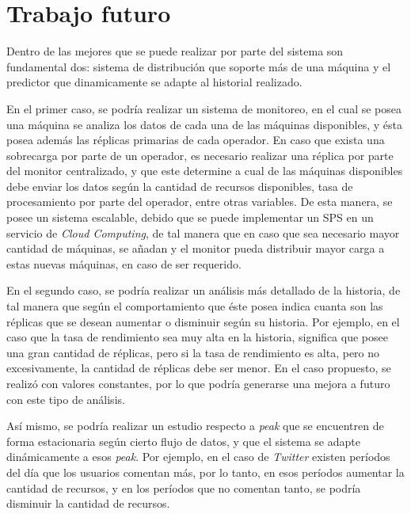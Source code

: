 \section{Trabajo futuro}

Dentro de las mejores que se puede realizar por parte del sistema son fundamental dos: sistema de distribución que soporte más de una máquina y el predictor que dinamicamente se adapte al historial realizado.

En el primer caso, se podría realizar un sistema de monitoreo, en el cual se posea una máquina se analiza los datos de cada una de las máquinas disponibles, y ésta posea además las réplicas primarias de cada operador. En caso que exista una sobrecarga por parte de un operador, es necesario realizar una réplica por parte del monitor centralizado, y que este determine a cual de las máquinas disponibles debe enviar los datos según la cantidad de recursos disponibles, tasa de procesamiento por parte del operador, entre otras variables. De esta manera, se posee un sistema escalable, debido que se puede implementar un SPS en un servicio de \textit{Cloud Computing}, de tal manera que en caso que sea necesario mayor cantidad de máquinas, se añadan y el monitor pueda distribuir mayor carga a estas nuevas máquinas, en caso de ser requerido.

En el segundo caso, se podría realizar un análisis más detallado de la historia, de tal manera que según el comportamiento que éste posea indica cuanta son las réplicas que se desean aumentar o disminuir según su historia. Por ejemplo, en el caso que la tasa de rendimiento sea muy alta en la historia, significa que posee una gran cantidad de réplicas, pero si la tasa de rendimiento es alta, pero no excesivamente, la cantidad de réplicas debe ser menor. En el caso propuesto, se realizó con valores constantes, por lo que podría generarse una mejora a futuro con este tipo de análisis.

Así mismo, se podría realizar un estudio respecto a \textit{peak} que se encuentren de forma estacionaria según cierto flujo de datos, y que el sistema se adapte dinámicamente a esos \textit{peak}. Por ejemplo, en el caso de \textit{Twitter} existen períodos del día que los usuarios comentan más, por lo tanto, en esos períodos aumentar la cantidad de recursos, y en los períodos que no comentan tanto, se podría disminuir la cantidad de recursos. 